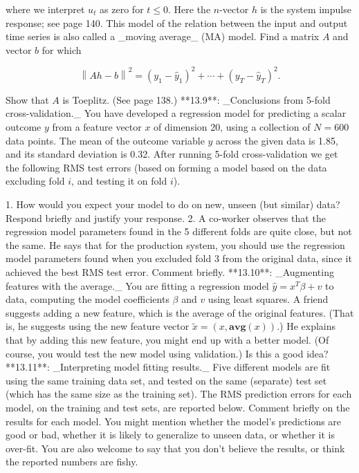 where we interpret \(u_{t}\) as zero for \(t\leq 0\). Here the \(n\)-vector \(h\) is the system impulse response; see page 140. This model of the relation between the input and output time series is also called a _moving average_ (MA) model. Find a matrix \(A\) and vector \(b\) for which

\[\left\|Ah-b\right\|^{2}=(y_{1}-\hat{y}_{1})^{2}+\cdots+(y_{T}-\hat{y}_{T})^{2}.\]

Show that \(A\) is Toeplitz. (See page 138.)
**13.9**: _Conclusions from 5-fold cross-validation._ You have developed a regression model for predicting a scalar outcome \(y\) from a feature vector \(x\) of dimension 20, using a collection of \(N=600\) data points. The mean of the outcome variable \(y\) across the given data is 1.85, and its standard deviation is 0.32. After running 5-fold cross-validation we get the following RMS test errors (based on forming a model based on the data excluding fold \(i\), and testing it on fold \(i\)).

1. How would you expect your model to do on new, unseen (but similar) data? Respond briefly and justify your response.
2. A co-worker observes that the regression model parameters found in the 5 different folds are quite close, but not the same. He says that for the production system, you should use the regression model parameters found when you excluded fold 3 from the original data, since it achieved the best RMS test error. Comment briefly.
**13.10**: _Augmenting features with the average._ You are fitting a regression model \(\hat{y}=x^{T}\beta+v\) to data, computing the model coefficients \(\beta\) and \(v\) using least squares. A friend suggests adding a new feature, which is the average of the original features. (That is, he suggests using the new feature vector \(\tilde{x}=(x,\mathbf{avg}(x))\).) He explains that by adding this new feature, you might end up with a better model. (Of course, you would test the new model using validation.) Is this a good idea?
**13.11**: _Interpreting model fitting results._ Five different models are fit using the same training data set, and tested on the same (separate) test set (which has the same size as the training set). The RMS prediction errors for each model, on the training and test sets, are reported below. Comment briefly on the results for each model. You might mention whether the model's predictions are good or bad, whether it is likely to generalize to unseen data, or whether it is over-fit. You are also welcome to say that you don't believe the results, or think the reported numbers are fishy.

